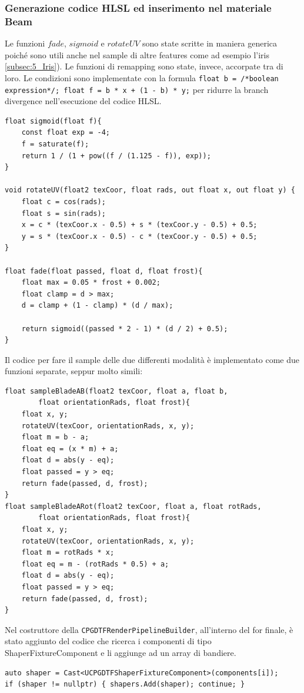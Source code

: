 \documentclass[main.tex]{subfiles}
\begin{document}
\subsubsection{Generazione codice HLSL ed inserimento nel materiale Beam}\label{subsec:5_1_ShaperHlsl}
\lstset{language=glsl}
Le funzioni $fade$, $sigmoid$ e $rotateUV$ sono state scritte in maniera generica poiché sono utili anche nel sample di altre features come ad esempio l'iris \ref{subsec:5_Iris}). Le funzioni di remapping sono state, invece, accorpate tra di loro. Le condizioni sono implementate con la formula \lstinline{float b = /*boolean expression*/; float f = b * x + (1 - b) * y;} per ridurre la branch divergence nell'esecuzione del codice HLSL.
\begin{lstlisting}
float sigmoid(float f){
	const float exp = -4;
	f = saturate(f);
	return 1 / (1 + pow((f / (1.125 - f)), exp));
}

void rotateUV(float2 texCoor, float rads, out float x, out float y) {
	float c = cos(rads);
	float s = sin(rads);
	x = c * (texCoor.x - 0.5) + s * (texCoor.y - 0.5) + 0.5;
	y = s * (texCoor.x - 0.5) - c * (texCoor.y - 0.5) + 0.5;
}

float fade(float passed, float d, float frost){
	float max = 0.05 * frost + 0.002;
	float clamp = d > max;
	d = clamp + (1 - clamp) * (d / max);

	return sigmoid((passed * 2 - 1) * (d / 2) + 0.5);
}
\end{lstlisting}

Il codice per fare il sample delle due differenti modalità è implementato come due funzioni separate, seppur molto simili:
\begin{lstlisting}
float sampleBladeAB(float2 texCoor, float a, float b,
		float orientationRads, float frost){
	float x, y;
	rotateUV(texCoor, orientationRads, x, y);
	float m = b - a;
	float eq = (x * m) + a;
	float d = abs(y - eq);
	float passed = y > eq;
	return fade(passed, d, frost);
}
float sampleBladeARot(float2 texCoor, float a, float rotRads,
		float orientationRads, float frost){
	float x, y;
	rotateUV(texCoor, orientationRads, x, y);
	float m = rotRads * x;
	float eq = m - (rotRads * 0.5) + a;
	float d = abs(y - eq);
	float passed = y > eq;
	return fade(passed, d, frost);
}
\end{lstlisting}


Nel costruttore della \lstinline{CPGDTFRenderPipelineBuilder}, all'interno del for finale, è stato aggiunto del codice che ricerca i componenti di tipo ShaperFixtureComponent e li aggiunge ad un array di bandiere.
\lstset{language=UEcpp}
\begin{lstlisting}
auto shaper = Cast<UCPGDTFShaperFixtureComponent>(components[i]);
if (shaper != nullptr) { shapers.Add(shaper); continue; }
\end{lstlisting}
\end{document}

